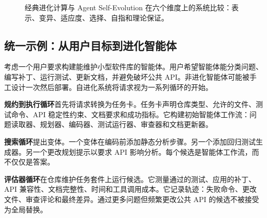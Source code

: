 \begin{figure}[htbp]
\caption{经典进化计算与 Agent Self-Evolution 在六个维度上的系统比较：表示、变异、适应度、选择、自指和理论保证。}
\label{fig:ch2-comparison}
\end{figure}

\subsection{统一示例：从用户目标到进化智能体}\label{sec:ch2-unifying-example}

考虑一个用户要求构建能维护小型软件库的智能体。用户希望智能体能分类问题、编写补丁、运行测试、更新文档，并避免破坏公共 API。非进化智能体可能被手工设计一次然后部署。自进化系统将请求视为一系列循环的开始。

\textbf{规约到执行循环}首先将请求转换为任务卡。任务卡声明仓库类型、允许的文件、测试命令、API 稳定性约束、文档要求和成功指标。它构建初始智能体工作流：问题读取器、规划器、编码器、测试运行器、审查器和文档更新器。

\textbf{搜索循环}提出变体。一个变体在编码前添加静态分析步骤。另一个添加回归测试生成器。另一个更改规划提示以要求 API 影响分析。每个候选是智能体工作流，而不仅仅是答案。

\textbf{评估器循环}在仓库维护任务套件上运行候选。它测量通过的测试、应用的补丁、API 兼容性、文档完整性、时间和工具调用成本。它记录轨迹：失败命令、更改文件、审查评论和最终差异。通过更多问题但频繁更改公共 API 的候选不被接受为全局替换。


